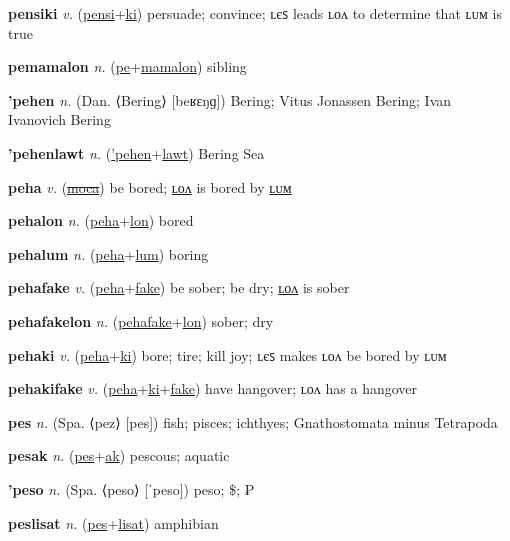 \textbf{\hypertarget{pensiki}{pensiki}} \textit{v.} (\hyperlink{pensi}{pensi}+\allowbreak \hyperlink{ki}{ki})
persuade; convince; ʟєꜱ leads ʟᴏᴧ to determine that ʟᴜᴍ is true

\textbf{\hypertarget{pemamalon}{pemamalon}} \textit{n.} (\hyperlink{pe}{pe}+\allowbreak \hyperlink{mamalon}{mamalon})
sibling

\textbf{\hypertarget{'pehen}{'pehen}} \textit{n.} (Dan. ⟨Bering⟩ [beʁɛŋɡ])
Bering; Vitus Jonassen Bering; Ivan Ivanovich Bering

\textbf{\hypertarget{'pehenlawt}{'pehenlawt}} \textit{n.} (\hyperlink{'pehen}{'pehen}+\allowbreak \hyperlink{lawt}{lawt})
Bering Sea

\textbf{\hypertarget{peha}{peha}} \textit{v.} (\hyperlink{moca}{\sout{moca}})
be bored; \hyperlink{pehalon}{ʟᴏᴧ} is bored by \hyperlink{pehalum}{ʟᴜᴍ}

\textbf{\hypertarget{pehalon}{pehalon}} \textit{n.} (\hyperlink{peha}{peha}+\allowbreak \hyperlink{lon}{lon})
bored

\textbf{\hypertarget{pehalum}{pehalum}} \textit{n.} (\hyperlink{peha}{peha}+\allowbreak \hyperlink{lum}{lum})
boring

\textbf{\hypertarget{pehafake}{pehafake}} \textit{v.} (\hyperlink{peha}{peha}+\allowbreak \hyperlink{fake}{fake})
be sober; be dry; \hyperlink{pehafakelon}{ʟᴏᴧ} is sober

\textbf{\hypertarget{pehafakelon}{pehafakelon}} \textit{n.} (\hyperlink{pehafake}{pehafake}+\allowbreak \hyperlink{lon}{lon})
sober; dry

\textbf{\hypertarget{pehaki}{pehaki}} \textit{v.} (\hyperlink{peha}{peha}+\allowbreak \hyperlink{ki}{ki})
bore; tire; kill joy; ʟєꜱ makes ʟᴏᴧ be bored by ʟᴜᴍ

\textbf{\hypertarget{pehakifake}{pehakifake}} \textit{v.} (\hyperlink{peha}{peha}+\allowbreak \hyperlink{ki}{ki}+\allowbreak \hyperlink{fake}{fake})
have hangover; ʟᴏᴧ has a hangover

\textbf{\hypertarget{pes}{pes}} \textit{n.} (Spa. ⟨pez⟩ [pes])
fish; pisces; ichthyes; Gnathostomata minus Tetrapoda

\textbf{\hypertarget{pesak}{pesak}} \textit{n.} (\hyperlink{pes}{pes}+\allowbreak \hyperlink{ak}{ak})
pescous; aquatic

\textbf{\hypertarget{'peso}{'peso}} \textit{n.} (Spa. ⟨peso⟩ [ˈpeso])
peso; \$; ₱

\textbf{\hypertarget{peslisat}{peslisat}} \textit{n.} (\hyperlink{pes}{pes}+\allowbreak \hyperlink{lisat}{lisat})
amphibian

